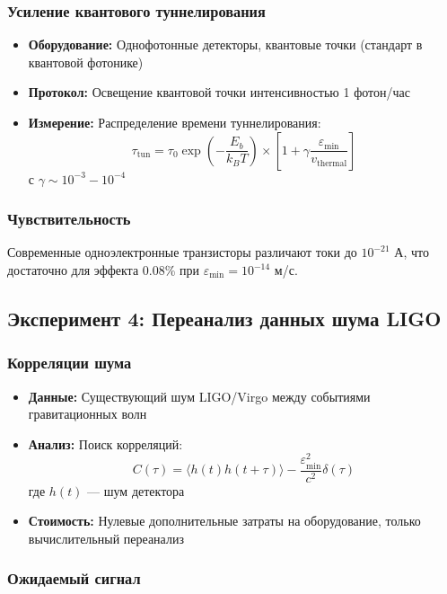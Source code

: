\documentclass[11pt,a4paper]{article}
\begin{document}
	\subsubsection{Усиление квантового туннелирования}
	
	\begin{itemize}
		\item \textbf{Оборудование:} Однофотонные детекторы, квантовые точки (стандарт в квантовой фотонике)
		\item \textbf{Протокол:} Освещение квантовой точки интенсивностью 1 фотон/час
		\item \textbf{Измерение:} Распределение времени туннелирования:
		\[
		\tau_{\text{tun}} = \tau_0 \exp\left(-\frac{E_b}{k_B T}\right) \times \left[1 + \gamma\frac{\varepsilon_{\min}}{v_{\text{thermal}}}\right]
		\]
		с $\gamma \sim 10^{-3} - 10^{-4}$
	\end{itemize}
	
	\subsubsection{Чувствительность}
	
	Современные одноэлектронные транзисторы различают токи до $10^{-21}$ А, что достаточно для эффекта 0.08\% при $\varepsilon_{\min} = 10^{-14}$ м/с.
	
	\subsection{Эксперимент 4: Переанализ данных шума LIGO}
	
	\subsubsection{Корреляции шума}
	
	\begin{itemize}
		\item \textbf{Данные:} Существующий шум LIGO/Virgo между событиями гравитационных волн
		\item \textbf{Анализ:} Поиск корреляций:
		\[
		C(\tau) = \langle h(t)h(t+\tau)\rangle - \frac{\varepsilon_{\min}^2}{c^2}\delta(\tau)
		\]
		где $h(t)$ — шум детектора
		\item \textbf{Стоимость:} Нулевые дополнительные затраты на оборудование, только вычислительный переанализ
	\end{itemize}
	
	\subsubsection{Ожидаемый сигнал}
	
\end{document}
